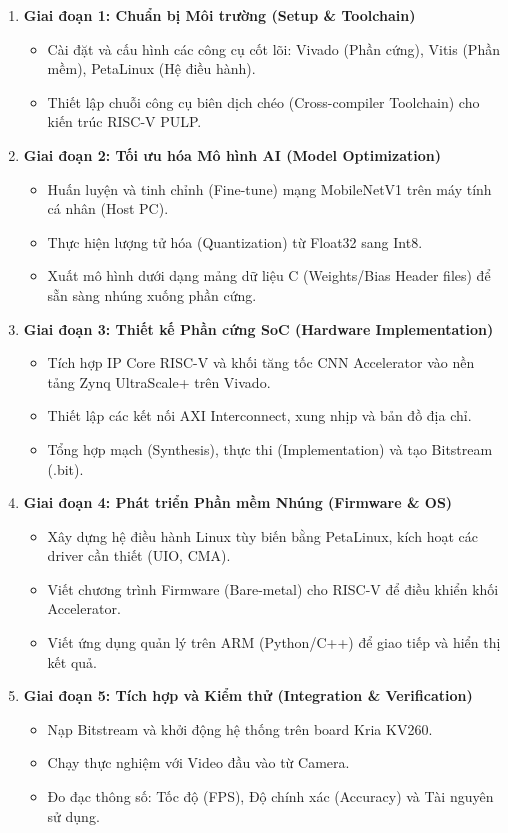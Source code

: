 \begin{enumerate}
    \item \textbf{Giai đoạn 1: Chuẩn bị Môi trường (Setup \& Toolchain)}
    \begin{itemize}
        \item Cài đặt và cấu hình các công cụ cốt lõi: Vivado (Phần cứng), Vitis (Phần mềm), PetaLinux (Hệ điều hành).
        \item Thiết lập chuỗi công cụ biên dịch chéo (Cross-compiler Toolchain) cho kiến trúc RISC-V PULP.
    \end{itemize}

    \item \textbf{Giai đoạn 2: Tối ưu hóa Mô hình AI (Model Optimization)}
    \begin{itemize}
        \item Huấn luyện và tinh chỉnh (Fine-tune) mạng MobileNetV1 trên máy tính cá nhân (Host PC).
        \item Thực hiện lượng tử hóa (Quantization) từ Float32 sang Int8.
        \item Xuất mô hình dưới dạng mảng dữ liệu C (Weights/Bias Header files) để sẵn sàng nhúng xuống phần cứng.
    \end{itemize}

    \item \textbf{Giai đoạn 3: Thiết kế Phần cứng SoC (Hardware Implementation)}
    \begin{itemize}
        \item Tích hợp IP Core RISC-V và khối tăng tốc CNN Accelerator vào nền tảng Zynq UltraScale+ trên Vivado.
        \item Thiết lập các kết nối AXI Interconnect, xung nhịp và bản đồ địa chỉ.
        \item Tổng hợp mạch (Synthesis), thực thi (Implementation) và tạo Bitstream (.bit).
    \end{itemize}

    \item \textbf{Giai đoạn 4: Phát triển Phần mềm Nhúng (Firmware \& OS)}
    \begin{itemize}
        \item Xây dựng hệ điều hành Linux tùy biến bằng PetaLinux, kích hoạt các driver cần thiết (UIO, CMA).
        \item Viết chương trình Firmware (Bare-metal) cho RISC-V để điều khiển khối Accelerator.
        \item Viết ứng dụng quản lý trên ARM (Python/C++) để giao tiếp và hiển thị kết quả.
    \end{itemize}

    \item \textbf{Giai đoạn 5: Tích hợp và Kiểm thử (Integration \& Verification)}
    \begin{itemize}
        \item Nạp Bitstream và khởi động hệ thống trên board Kria KV260.
        \item Chạy thực nghiệm với Video đầu vào từ Camera.
        \item Đo đạc thông số: Tốc độ (FPS), Độ chính xác (Accuracy) và Tài nguyên sử dụng.
    \end{itemize}
\end{enumerate}

